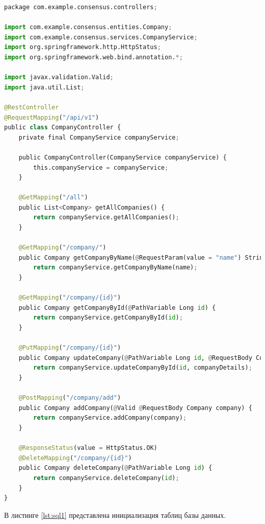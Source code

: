 \begin{lstlisting}[label=lst:control2, caption=Пример реализации взаимодействия клиента с сервером, language=python]
package com.example.consensus.controllers;

import com.example.consensus.entities.Company;
import com.example.consensus.services.CompanyService;
import org.springframework.http.HttpStatus;
import org.springframework.web.bind.annotation.*;

import javax.validation.Valid;
import java.util.List;

@RestController
@RequestMapping("/api/v1")
public class CompanyController {
	private final CompanyService companyService;

	public CompanyController(CompanyService companyService) {
		this.companyService = companyService;
	}

	@GetMapping("/all")
	public List<Company> getAllCompanies() {
		return companyService.getAllCompanies();
	}

	@GetMapping("/company/")
	public Company getCompanyByName(@RequestParam(value = "name") String name) {
		return companyService.getCompanyByName(name);
	}

	@GetMapping("/company/{id}")
	public Company getCompanyById(@PathVariable Long id) {
		return companyService.getCompanyById(id);
	}

	@PutMapping("/company/{id}")
	public Company updateCompany(@PathVariable Long id, @RequestBody Company companyDetails) {
		return companyService.updateCompanyById(id, companyDetails);
	}

	@PostMapping("/company/add")
	public Company addCompany(@Valid @RequestBody Company company) {
		return companyService.addCompany(company);
	}

	@ResponseStatus(value = HttpStatus.OK)
	@DeleteMapping("/company/{id}")
	public Company deleteCompany(@PathVariable Long id) {
		return companyService.deleteCompany(id);
	}
}	
\end{lstlisting}

В листинге \ref{lst:sql1} представлена инициализация таблиц базы данных.


